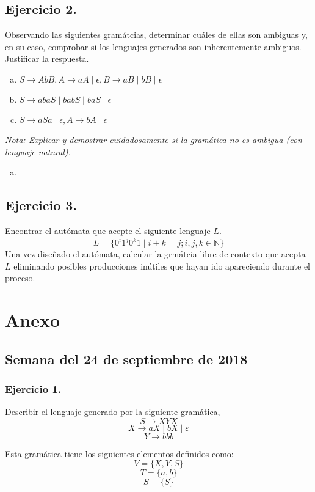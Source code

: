 \documentclass[11pt,a4paper]{article}
\begin{document}
\subsection{Ejercicio 2.} Observando las siguientes gramátcias, determinar cuáles de ellas son ambiguas y, en su caso, comprobar si los lenguajes generados son inherentemente ambiguos. Justificar la respuesta.
	\begin{enumerate}[a)]
		\item $S\rightarrow AbB, A\rightarrow aA\mid \epsilon, B\rightarrow aB\mid bB\mid \epsilon$
		\item $S\rightarrow abaS\mid babS\mid baS\mid \epsilon$
		\item $S\rightarrow aSa\mid \epsilon, A\rightarrow bA\mid \epsilon$
	\end{enumerate}
\textit{\underline{Nota}: Explicar y demostrar cuidadosamente si la gramática no es ambigua (con lenguaje natural).}
	\begin{enumerate}[a)]
		\item 
	\end{enumerate}
	
\subsection{Ejercicio 3.} Encontrar el autómata que acepte el siguiente lenguaje $L$.
\[L=\{0^i1^j0^k1\mid i+k=j; i,j,k\in \mathbb{N}\}\]
Una vez diseñado el autómata, calcular la grmátcia libre de contexto que acepta $L$ eliminando posibles producciones inútiles que hayan ido apareciendo durante el proceso.

\newpage

\section{Anexo}
\subsection{Semana del 24 de septiembre de 2018}

\subsubsection{Ejercicio 1.} Describir el lenguaje generado por la siguiente gramática,\\
	\[S\rightarrow XYX \]
	\[X\rightarrow aX \mid bX \mid \varepsilon\]
	\[Y\rightarrow bbb\]
	
Esta gramática tiene los siguientes elementos definidos como:
	\[V=\{X,Y,S\}\]
	\[T=\{a,b\}\]
	\[S=\{S\}\]
	
\end{document}
